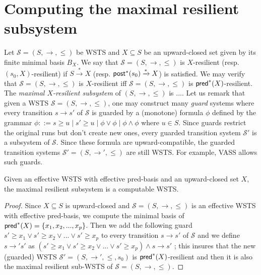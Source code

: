 \section{Computing the maximal resilient subsystem}

Let $\mathscr{S}=(S, \rightarrow, \leq)$ be WSTS and $X \subseteq S$ be an upward-closed set given by its finite minimal basis $B_X$. We say that $\mathscr{S}=(S, \rightarrow, \leq)$ is $X$-resilient (resp. $(s_0,X)$-resilient) if $S  \xrightarrow{*} X$ (resp. $\textsf{post}^*(s_0) \xrightarrow{*} X$) is satisfied.  We may verify that  $\mathscr{S}=(S, \rightarrow, \leq)$ is $X$-resilient iff  $\mathscr{S}=(S, \rightarrow, \leq)$ is $\textsf{pred}^*(X)$-resilient. The \emph{maximal $X$-resilient subsystem} of $(S,\rightarrow,\leq)$ is ....
Let us remark that given a WSTS $\mathscr{S}=(S, \rightarrow, \leq)$, one may construct many \emph{guard} systems where every transition $s \rightarrow s'$ of $\mathscr{S}$ is guarded by a (monotone) formula $\phi$ defined by the grammar $\phi ::= s \geq u \mid s' \geq u \mid \phi \vee \phi \mid \phi \wedge \phi$ where $u \in S$. Since guards restrict the original runs but don't create new ones, every guarded transition system $\mathscr{S'}$ is a subsystem of $\mathscr{S}$. Since these formula are upward-compatible, the guarded transition systems $\mathscr{S'}=(S, \rightarrow', \leq)$ are still WSTS.
%
For example, VASS allows such guards.

\begin{theorem}{}
Given an effective WSTS with effective pred-basis and an upward-closed set $X$, the maximal resilient subsystem is a computable WSTS.
\end{theorem}

\begin{proof}
Since $X \subseteq S$ is upward-closed and $\mathscr{S}=(S, \rightarrow, \leq)$ is an effective WSTS with effective pred-basis, we compute the minimal basis of $\textsf{pred}^*(X)=\{x_1,x_2,...,x_p\}$. 
%
%
Then we add the following guard $s' \geq x_1  	\vee s' \geq x_2  	\vee...	\vee s' \geq x_p$ to every transition $s \rightarrow s'$ of $\mathscr{S}$ and we define  $s \rightarrow' s'$ as $(s' \geq x_1  	\vee s' \geq x_2  	\vee...	\vee s' \geq x_p) \wedge s \rightarrow s'$ ; this insures that the new (guarded) WSTS $\mathscr{S'}=(S, \rightarrow', \leq,s_0)$ is $\textsf{pred}^*(X)$-resilient and then it is also the maximal resilient sub-WSTS of $\mathscr{S}=(S, \rightarrow, \leq)$.

\end{proof}
%
%

